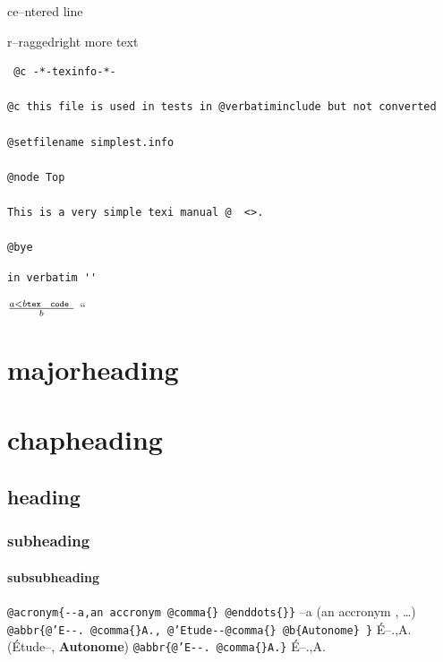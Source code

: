 \documentclass{book}
\newcommand{\Texinfoplaceholder}[1]{}
\newcommand{\Texinfonopagebreakheading}[2]{{\let\clearpage\relax \let\cleardoublepage\relax \let\thispagestyle\Texinfoplaceholder #1{#2}}}
\renewcommand{\_}{\Texinfounderscore\discretionary{}{}{}}
\begin{document}
\begin{titlepage}
{\begin{center}
ce--ntered line
\end{center}

\begin{flushleft}
r--raggedright
more text
\end{flushleft}

\begin{verbatim}
 @c -*-texinfo-*-

@c this file is used in tests in @verbatiminclude but not converted

@setfilename simplest.info

@node Top

This is a very simple texi manual @  <>.

@bye
\end{verbatim}

\begin{verbatim}
in verbatim ''
\end{verbatim}





$\frac{a < b \texttt{tex \hbox{ code }}}{b}$ ``

\Texinfonopagebreakheading{\chapter*}{{majorheading}}

\Texinfonopagebreakheading{\chapter*}{{chapheading}}

\section*{{heading}}

\subsection*{{subheading}}

\subsubsection*{{subsubheading}}


\texttt{@acronym\{{-}{-}a,an accronym @comma\{\}\ @enddots\{\}\}} --a (an accronym , \dots{})
\texttt{@abbr\{@'E{-}{-}.\ @comma\{\}A.,\ @'Etude{-}{-}@comma\{\}\ @b\{Autonome\}\ \}} \'{E}--.\@ ,A.\@ (\'{E}tude--, \textbf{Autonome})
\texttt{@abbr\{@'E{-}{-}.\ @comma\{\}A.\}} \'{E}--.\@ ,A.\@

}
\end{titlepage}
\end{document}
